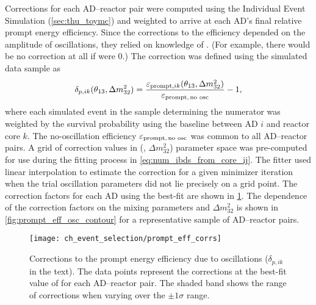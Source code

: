 Corrections for each AD--reactor pair were computed
using the Individual Event Simulation (\cref{sec:thu_toymc})
and weighted to arrive at each AD's final relative prompt energy efficiency.
Since the corrections to the efficiency depended on
the amplitude of \nuebar{} oscillations, they relied on knowledge of \thetaot.
(For example, there would be no correction at all if \thetaot{} were $0$.)
The correction was defined using the simulated data sample as
\begin{equation}\label{eq:prompt_osc_correction}
    \delta_{p,ik}(\theta_{13}, \Delta m^2_{32}) =
    \frac{\varepsilon_{\text{prompt},ik}(\theta_{13}, \Delta m^2_{32})}{
        \varepsilon_{\text{prompt,\,no osc}}
    } - 1,
\end{equation}
where each simulated event in the sample determining the numerator
was weighted by the survival probability
using the baseline between AD $i$ and reactor core $k$.
The no-oscillation efficiency $\varepsilon_{\text{prompt,\,no osc}}$
was common to all AD--reactor pairs.
A grid of correction values in (\thetaot{}, $\Delta m^2_{32}$) parameter space
was pre-computed for use during the fitting process
in \cref{eq:num_ibds_from_core_ij}.
The fitter used linear interpolation to estimate the correction for
a given minimizer iteration when the trial oscillation parameters
did not lie precisely on a grid point.
The correction factors for each AD using the best-fit \thetaot{}
are shown in \cref{fig:prompt_eff_osc}.
The dependence of the correction factors
on the mixing parameters \thetaot{} and $\Delta m^2_{32}$
is shown in \cref{fig:prompt_eff_osc_contour}
for a representative sample of AD--reactor pairs.

\begin{figure}
    \centering
    \texttt{[image: ch\_event\_selection/prompt\_eff\_corrs]}
    \caption[Prompt efficiency corrections due to oscillation effects]{
        Corrections to the prompt energy efficiency due to \nuebar{} oscillations
        ($\delta_{p,ik}$ in the text).
        The data points represent the corrections at the best-fit
        value of \thetaot{} for each AD--reactor pair.
        The shaded band shows the range of corrections when varying \thetaot{}
        over the $\pm1\sigma$ range.
    }
    \label{fig:prompt_eff_osc}
\end{figure}

